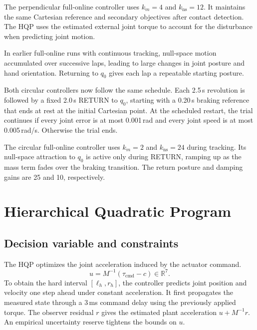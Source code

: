 \documentclass[12pt,a4paper]{article}
\begin{document}
The perpendicular full-online controller uses $k_m = 4$ and $k_{\mathrm{ns}} = 12$.
It maintains the same Cartesian reference and secondary objectives after contact
detection. The HQP uses the estimated external joint torque to account for the
disturbance when predicting joint motion.

In earlier full-online runs with continuous tracking, null-space motion accumulated
over successive laps, leading to large changes in joint posture and hand orientation.
Returning to $q_0$ gives each lap a repeatable starting posture.

Both circular controllers now follow the same schedule. Each 2.5\,s revolution is
followed by a fixed 2.0\,s RETURN to $q_0$, starting with a 0.20\,s braking reference
that ends at rest at the initial Cartesian point. At the scheduled restart, the
trial continues if every joint error is at most 0.001\,rad and every joint speed is at
most 0.005\,rad/s. Otherwise the trial ends.

The circular full-online controller uses $k_m = 2$ and $k_{\mathrm{ns}} = 24$ during tracking.
Its null-space attraction to $q_0$ is active only during RETURN, ramping up as the
mass term fades over the braking transition. The return posture and damping
gains are 25 and 10, respectively.

\section{Hierarchical Quadratic Program}

\subsection{Decision variable and constraints}
The HQP optimizes the joint acceleration induced by the actuator command.
\begin{equation}
  u = M^{-1} (\tau_{\mathrm{cmd}} - c) \in \mathbb{R}^7 .
\end{equation}
To obtain the hard interval $[\ell_h,r_h]$, the controller predicts joint position
and velocity one step ahead under constant acceleration. It first propagates the
measured state through a 3\,ms command delay using the previously applied torque.
The observer residual $r$ gives the estimated plant acceleration $u+M^{-1}r$.
An empirical uncertainty reserve tightens the bounds on $u$.
\end{document}
